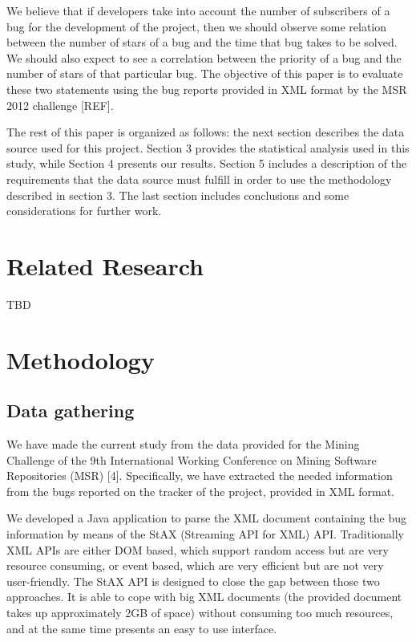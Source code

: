 \documentclass[10pt, conference, compsocconf]{IEEEtran}
\begin{document}
We believe that if developers take into account the number of subscribers of a bug for the development of the project, then we should observe some relation between the number of stars of a bug and the time that bug takes to be solved. We should also expect to see a correlation between the priority of a bug and the number of stars of that particular bug. The objective of this paper is to evaluate these two statements using the bug reports provided in XML format by the MSR 2012 challenge [REF].

The rest of this paper is organized as follows: the next section describes the data source used for this project. Section 3 provides the statistical analysis used in this study, while Section 4 presents our results. Section 5 includes a description of the requirements that the data source must fulfill in order to use the methodology described in section 3. The last section includes conclusions and some considerations for further work.

\section{Related Research}
TBD

\section{Methodology}

\subsection {Data gathering}
We have made the current study from the data provided for the Mining Challenge of the 9th International Working Conference on Mining Software Repositories (MSR) [4]. Specifically, we have extracted the needed information from the bugs reported on the tracker of the project, provided in XML format.

We developed a Java application to parse the XML document containing the bug information by means of the StAX (Streaming API for XML) API. Traditionally XML APIs are either DOM based, which support random access but are very resource consuming, or event based, which are very efficient but are not very user-friendly. The StAX API is designed to close the gap between those two approaches. It is able to cope with big XML documents (the provided document takes up approximately 2GB of space) without consuming too much resources, and at the same time presents an easy to use interface.
\end{document}

